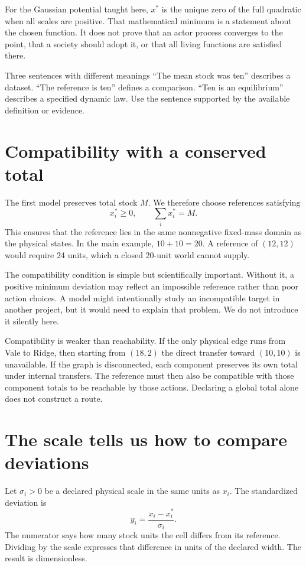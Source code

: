 For the Gaussian potential taught here, \(x^*\) is the unique zero of the full quadratic when all scales are positive. That mathematical minimum is a statement about the chosen function. It does not prove that an actor process converges to the point, that a society should adopt it, or that all living functions are satisfied there.

\begin{intuitionbox}{Three sentences with different meanings}
``The mean stock was ten'' describes a dataset. ``The reference is ten'' defines a comparison. ``Ten is an equilibrium'' describes a specified dynamic law. Use the sentence supported by the available definition or evidence.
\end{intuitionbox}

\section{Compatibility with a conserved total}
The first model preserves total stock \(M\). We therefore choose references satisfying
\begin{equation}
 x_i^*\geq0,\qquad \sum_i x_i^*=M.
\end{equation}
This ensures that the reference lies in the same nonnegative fixed-mass domain as the physical states. In the main example, \(10+10=20\). A reference of \((12,12)\) would require 24 units, which a closed 20-unit world cannot supply.

The compatibility condition is simple but scientifically important. Without it, a positive minimum deviation may reflect an impossible reference rather than poor action choices. A model might intentionally study an incompatible target in another project, but it would need to explain that problem. We do not introduce it silently here.

Compatibility is weaker than reachability. If the only physical edge runs from Vale to Ridge, then starting from \((18,2)\) the direct transfer toward \((10,10)\) is unavailable. If the graph is disconnected, each component preserves its own total under internal transfers. The reference must then also be compatible with those component totals to be reachable by those actions. Declaring a global total alone does not construct a route.

\section{The scale tells us how to compare deviations}
Let \(\sigma_i>0\) be a declared physical scale in the same units as \(x_i\). The standardized deviation is
\begin{equation}
 y_i=\frac{x_i-x_i^*}{\sigma_i}.
\end{equation}
The numerator says how many stock units the cell differs from its reference. Dividing by the scale expresses that difference in units of the declared width. The result is dimensionless.

